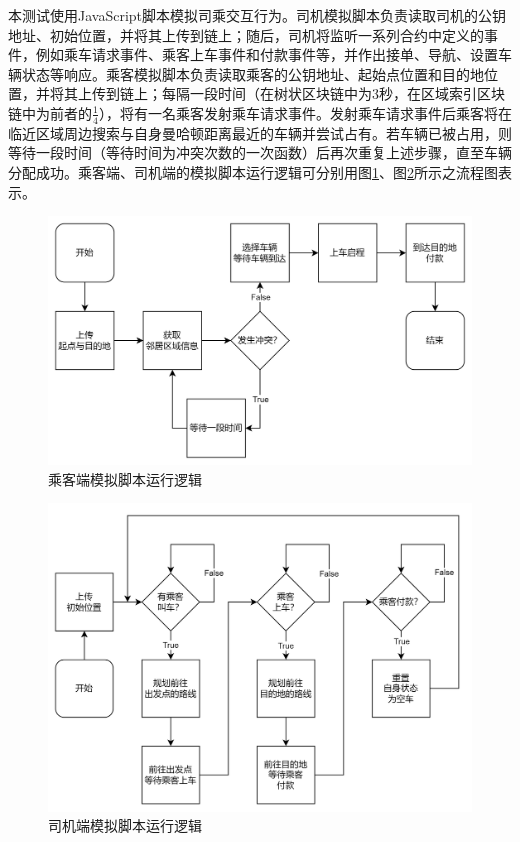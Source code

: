 本测试使用JavaScript脚本模拟司乘交互行为。司机模拟脚本负责读取司机的公钥地址、初始位置，并将其上传到链上；随后，司机将监听一系列合约中定义的事件，例如乘车请求事件、乘客上车事件和付款事件等，并作出接单、导航、设置车辆状态等响应。乘客模拟脚本负责读取乘客的公钥地址、起始点位置和目的地位置，并将其上传到链上；每隔一段时间（在树状区块链中为3秒，在区域索引区块链中为前者的$\frac14$），将有一名乘客发射乘车请求事件。发射乘车请求事件后乘客将在临近区域周边搜索与自身曼哈顿距离最近的车辆并尝试占有。若车辆已被占用，则等待一段时间（等待时间为冲突次数的一次函数）后再次重复上述步骤，直至车辆分配成功。乘客端、司机端的模拟脚本运行逻辑可分别用图\ref{乘客端模拟脚本运行逻辑}、图\ref{司机端模拟脚本运行逻辑}所示之流程图表示。

\begin{figure}[htbp]
    \centering
    \includegraphics[width=\textwidth]{images/passenger示意图.png}
    \caption{乘客端模拟脚本运行逻辑}\label{乘客端模拟脚本运行逻辑} %
\end{figure}

\begin{figure}[htbp]
    \centering
    \includegraphics[width=\textwidth]{images/vehicle示意图.png}
    \caption{司机端模拟脚本运行逻辑}\label{司机端模拟脚本运行逻辑} %
\end{figure}

